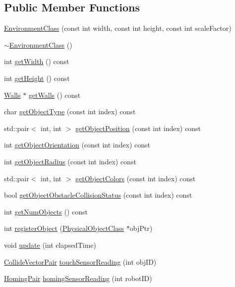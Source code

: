 \subsection*{Public Member Functions}
\begin{DoxyCompactItemize}
\item 
\hyperlink{classEnvironment_a0d6de4e71ec9dee425caa64988f8b1d2}{Environment\-Class} (const int width, const int height, const int scale\-Factor)
\item 
\hyperlink{classEnvironment_aabb6f5dbf44044416ae3850d206daca8}{$\sim$\-Environment\-Class} ()
\item 
int \hyperlink{classEnvironment_a6fab343ab5c7c9da393afad7e229c7e7}{get\-Width} () const 
\item 
int \hyperlink{classEnvironment_a5e5cc1ca64c361b61ea5e9138b72d600}{get\-Height} () const 
\item 
\hyperlink{classWalls}{Walls} $\ast$ \hyperlink{classEnvironment_ac1c2bcef43d102ff23d530d283ab9b24}{get\-Walls} () const 
\item 
char \hyperlink{classEnvironment_a300e1cd16d91cecea93054db0f3b97e0}{get\-Object\-Type} (const int index) const 
\item 
std\-::pair$<$ int, int $>$ \hyperlink{classEnvironment_a5fe3d846413f2dfede37247ffd4812c9}{get\-Object\-Position} (const int index) const 
\item 
int \hyperlink{classEnvironment_a83e1495a00d28ab5f384828f713f42eb}{get\-Object\-Orientation} (const int index) const 
\item 
int \hyperlink{classEnvironment_afcc8871adb6e2a4a36b00b3a2f06781e}{get\-Object\-Radius} (const int index) const 
\item 
std\-::pair$<$ int, int $>$ \hyperlink{classEnvironment_afda472c77cee9d7b17c371017a20a304}{get\-Object\-Colors} (const int index) const 
\item 
bool \hyperlink{classEnvironment_a270a27dbdffcf13bc024df951c4de552}{get\-Object\-Obstacle\-Collision\-Status} (const int index) const 
\item 
int \hyperlink{classEnvironment_a831e8bf09ccd5b29e54789e567aab1fd}{get\-Num\-Objects} () const 
\item 
int \hyperlink{classEnvironment_ae80ff308b1e48bba139fc8c5ad40e8d6}{register\-Object} (\hyperlink{classBaseObject}{Physical\-Object\-Class} $\ast$obj\-Ptr)
\item 
void \hyperlink{classEnvironment_ad1533a082fbc64c4d45d66efec944e50}{update} (int elapsed\-Time)
\item 
\hyperlink{classEnvironment_a76889d11a26328e6a105679db7cebf14}{Collide\-Vector\-Pair} \hyperlink{classEnvironment_a4685cd22ff65035ac7152194666c9563}{touch\-Sensor\-Reading} (int obj\-I\-D)
\item 
\hyperlink{classEnvironment_a2f5699350dc2d65fd4dc6974e03a7cf5}{Homing\-Pair} \hyperlink{classEnvironment_ae0bdc3559c6270bdbb6dfa19b34d1eb9}{homing\-Sensor\-Reading} (int robot\-I\-D)
\end{DoxyCompactItemize}


